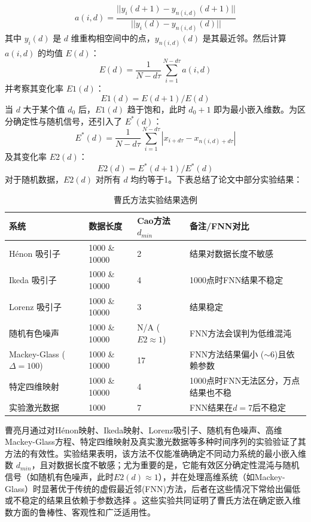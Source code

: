 \begin{equation}
a(i,d) = \frac{||y_i(d+1) - y_{n(i,d)}(d+1)||}{||y_i(d) - y_{n(i,d)}(d)||}
\end{equation}
其中 $y_i(d)$ 是 $d$ 维重构相空间中的点，$y_{n(i,d)}(d)$ 是其最近邻。然后计算 $a(i,d)$ 的均值 $E(d)$：
\begin{equation}
E(d) = \frac{1}{N-d\tau}\sum_{i=1}^{N-d\tau} a(i,d)
\end{equation}
并考察其变化率 $E1(d)$：
\begin{equation}
E1(d) = E(d+1)/E(d)
\end{equation}
当 $d$ 大于某个值 $d_0$ 后，$E1(d)$ 趋于饱和，此时 $d_0+1$ 即为最小嵌入维数。为区分确定性与随机信号，还引入了 $E^*(d)$：
\begin{equation}
E^*(d) = \frac{1}{N-d\tau}\sum_{i=1}^{N-d\tau} |x_{i+d\tau} - x_{n(i,d)+d\tau}|
\end{equation}
及其变化率 $E2(d)$：
\begin{equation}
E2(d) = E^*(d+1)/E^*(d)
\end{equation}
对于随机数据，$E2(d)$ 对所有 $d$ 均约等于1。下表总结了论文中部分实验结果：

\begin{table}[h!]
    \centering
    \caption{曹氏方法实验结果选例}
    \begin{tabular}{|l|l|l|l|}
    \hline
    \textbf{系统} & \textbf{数据长度} & \textbf{Cao方法 $d_{min}$} & \textbf{备注/FNN对比} \\
    \hline
    Hénon 吸引子 & 1000 \& 10000 & 2 & 结果对数据长度不敏感 \\
    \hline
    Ikeda 吸引子 & 1000 \& 10000 & 4 & 1000点时FNN结果不稳定 \\
    \hline
    Lorenz 吸引子 & 1000 \& 10000 & 3 & 结果稳定 \\
    \hline
    随机有色噪声 & 1000 \& 10000 & N/A ($E2 \approx 1$) & FNN方法会误判为低维混沌 \\
    \hline
    Mackey-Glass ($\Delta=100$) & 1000 \& 10000 & 17 & FNN方法结果偏小 ($\sim$6)且依赖参数 \\
    \hline
    特定四维映射 & 1000 \& 10000 & 4 & 1000点时FNN无法区分，万点结果也不稳 \\
    \hline
    实验激光数据 & 1000 & 7 & FNN结果在$d=7$后不稳定 \\
    \hline
    \end{tabular}
    \end{table}

    曹亮月通过对Hénon映射、Ikeda映射、Lorenz吸引子、随机有色噪声、高维Mackey-Glass方程、特定四维映射及真实激光数据等多种时间序列的实验验证了其方法的有效性。实验结果表明，该方法不仅能准确确定不同动力系统的最小嵌入维数 $d_{min}$，且对数据长度不敏感；尤为重要的是，它能有效区分确定性混沌与随机信号（如随机有色噪声，此时$E2(d) \approx 1$），并在处理高维系统（如Mackey-Glass）时显著优于传统的虚假最近邻(FNN)方法，后者在这些情况下常给出偏低或不稳定的结果且依赖于参数选择 。这些实验共同证明了曹氏方法在确定嵌入维数方面的鲁棒性、客观性和广泛适用性。

